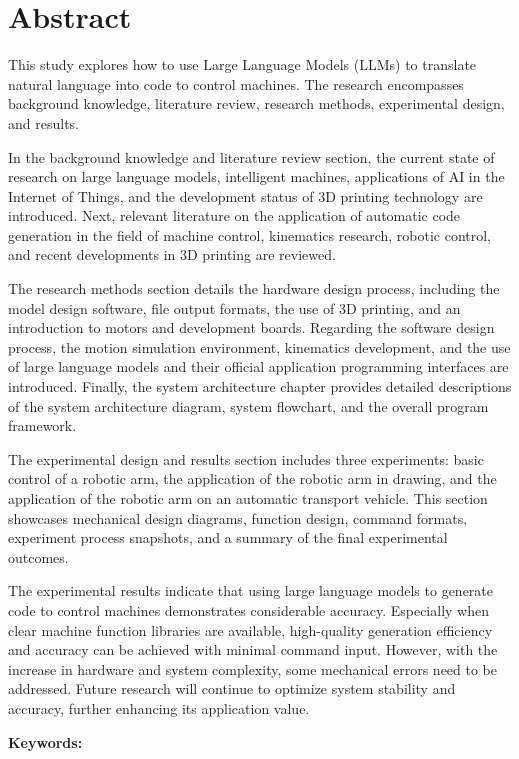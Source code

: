 \documentclass[class=NCU_thesis, crop=false]{standalone}
\begin{document}
\chapter{Abstract}

This study explores how to use Large Language Models (LLMs) to translate natural language into code to control machines. The research encompasses background knowledge, literature review, research methods, experimental design, and results.

In the background knowledge and literature review section, the current state of research on large language models, intelligent machines, applications of AI in the Internet of Things, and the development status of 3D printing technology are introduced. Next, relevant literature on the application of automatic code generation in the field of machine control, kinematics research, robotic control, and recent developments in 3D printing are reviewed.

The research methods section details the hardware design process, including the model design software, file output formats, the use of 3D printing, and an introduction to motors and development boards. Regarding the software design process, the motion simulation environment, kinematics development, and the use of large language models and their official application programming interfaces are introduced. Finally, the system architecture chapter provides detailed descriptions of the system architecture diagram, system flowchart, and the overall program framework.

The experimental design and results section includes three experiments: basic control of a robotic arm, the application of the robotic arm in drawing, and the application of the robotic arm on an automatic transport vehicle. This section showcases mechanical design diagrams, function design, command formats, experiment process snapshots, and a summary of the final experimental outcomes.

The experimental results indicate that using large language models to generate code to control machines demonstrates considerable accuracy. Especially when clear machine function libraries are available, high-quality generation efficiency and accuracy can be achieved with minimal command input. However, with the increase in hardware and system complexity, some mechanical errors need to be addressed. Future research will continue to optimize system stability and accuracy, further enhancing its application value.

\vspace{2em}
\noindent \textbf{Keywords:} \keywordsEn{} %
\end{document}
